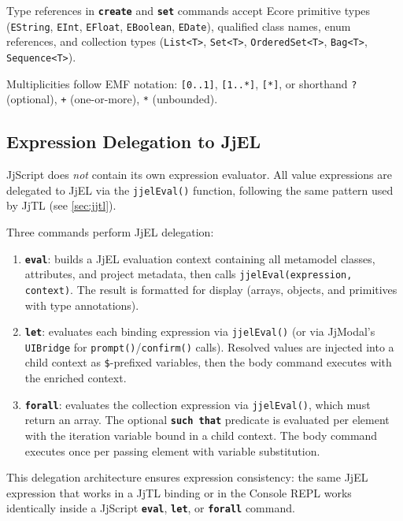 \documentclass[11pt,a4paper]{article}
\newcommand{\jjmodal}{\textsf{JjModal}}
\newcommand{\jjscript}{\textsf{JjScript}}
\newcommand{\jjel}{\textsf{JjEL}}
\newcommand{\jjtl}{\textsf{JjTL}}
\newcommand{\kw}[1]{\texttt{\textbf{#1}}}
\begin{document}
Type references in \kw{create} and \kw{set} commands accept Ecore
primitive types (\texttt{EString}, \texttt{EInt}, \texttt{EFloat},
\texttt{EBoolean}, \texttt{EDate}), qualified class names, enum
references, and collection types (\texttt{List<T>}, \texttt{Set<T>},
\texttt{OrderedSet<T>}, \texttt{Bag<T>}, \texttt{Sequence<T>}).

Multiplicities follow EMF notation: \texttt{[0..1]}, \texttt{[1..*]},
\texttt{[*]}, or shorthand \texttt{?} (optional), \texttt{+}
(one-or-more), \texttt{*} (unbounded).


\subsection{Expression Delegation to JjEL}\label{sec:jjscript-jjel}

\jjscript{} does \emph{not} contain its own expression evaluator. All
value expressions are delegated to \jjel{} via the \texttt{jjelEval()}
function, following the same pattern used by \jjtl{} (see
\cref{sec:jjtl}).

Three commands perform \jjel{} delegation:

\begin{enumerate}
    \item \textbf{\kw{eval}}: builds a \jjel{} evaluation context
          containing all metamodel classes, attributes, and project metadata,
          then calls \texttt{jjelEval(expression, context)}. The result is
          formatted for display (arrays, objects, and primitives with type
          annotations).
    \item \textbf{\kw{let}}: evaluates each binding expression via
          \texttt{jjelEval()} (or via \jjmodal{}'s \texttt{UIBridge} for
          \texttt{prompt()}/\texttt{confirm()} calls). Resolved values are
          injected into a child context as \texttt{\$}-prefixed variables,
          then the body command executes with the enriched context.
    \item \textbf{\kw{forall}}: evaluates the collection expression via
          \texttt{jjelEval()}, which must return an array. The optional
          \kw{such that} predicate is evaluated per element with the
          iteration variable bound in a child context. The body command
          executes once per passing element with variable substitution.
\end{enumerate}

This delegation architecture ensures expression consistency: the same
\jjel{} expression that works in a \jjtl{} binding or in the Console
REPL works identically inside a \jjscript{} \kw{eval}, \kw{let}, or
\kw{forall} command.
\end{document}
